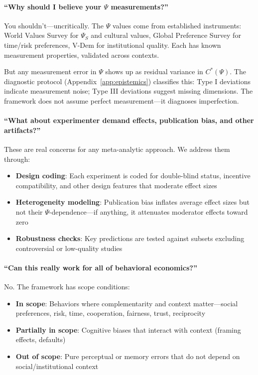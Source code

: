 \paragraph{``Why should I believe your $\Psi$ measurements?''}
You shouldn't---uncritically. The $\Psi$ values come from established
instruments: World Values Survey for $\Psi_S$ and cultural values,
Global Preference Survey for time/risk preferences, V-Dem for institutional
quality. Each has known measurement properties, validated across contexts.

But any measurement error in $\Psi$ shows up as residual variance in
$C^*(\Psi)$. The diagnostic protocol (Appendix~\ref{app:epistemics})
classifies this: Type I deviations indicate measurement noise; Type III
deviations suggest missing dimensions. The framework does not assume perfect
measurement---it diagnoses imperfection.

\paragraph{``What about experimenter demand effects, publication bias, and other artifacts?''}
These are real concerns for any meta-analytic approach. We address them through:
\begin{itemize}
    \item \textbf{Design coding}: Each experiment is coded for double-blind
          status, incentive compatibility, and other design features that
          moderate effect sizes
    \item \textbf{Heterogeneity modeling}: Publication bias inflates average
          effect sizes but not their $\Psi$-dependence---if anything, it
          attenuates moderator effects toward zero
    \item \textbf{Robustness checks}: Key predictions are tested against
          subsets excluding controversial or low-quality studies
\end{itemize}

\paragraph{``Can this really work for all of behavioral economics?''}
No. The framework has scope conditions:
\begin{itemize}
    \item \textbf{In scope}: Behaviors where complementarity and context
          matter---social preferences, risk, time, cooperation, fairness,
          trust, reciprocity
    \item \textbf{Partially in scope}: Cognitive biases that interact with
          context (framing effects, defaults)
    \item \textbf{Out of scope}: Pure perceptual or memory errors that do not
          depend on social/institutional context
\end{itemize}

